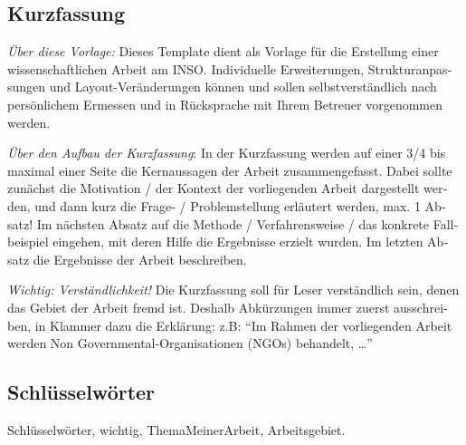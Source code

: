
\cleardoublepage
{}


\begin{otherlanguage}{ngerman}
 
  \chapter*{Kurzfassung}

	\emph{Über diese Vorlage:} 
	Dieses Template dient als Vorlage für die Erstellung einer wissenschaftlichen Arbeit am INSO. Individuelle Erweiterungen, Strukturanpassungen und Layout-Veränderungen können und sollen selbstverständlich nach persönlichem Ermessen und in Rücksprache mit Ihrem Betreuer vorgenommen werden.

	\emph{Über den Aufbau der Kurzfassung}: 
	In der Kurzfassung werden auf einer 3/4 bis maximal einer Seite die Kernaussagen der Arbeit zusammengefasst. Dabei sollte zunächst die Motivation / der Kontext der vorliegenden Arbeit dargestellt werden, und dann kurz die Frage- / Problemstellung erläutert werden, max. 1 Absatz! Im nächsten Absatz auf die Methode / Verfahrensweise / das konkrete Fallbeispiel eingehen, mit deren Hilfe die Ergebnisse erzielt wurden. Im letzten Absatz die Ergebnisse der Arbeit beschreiben. 

	\emph{Wichtig: Verständlichkeit!} 
	Die Kurzfassung soll für Leser verständlich sein, denen das Gebiet der Arbeit fremd ist. Deshalb Abkürzungen immer zuerst ausschreiben, in Klammer dazu die Erklärung: z.B: ``Im Rahmen der vorliegenden Arbeit werden Non Governmental-Organisationen (NGOs) behandelt, \ldots''

  \bigskip
  
  \section*{Schl\"usselw\"orter}
  Schl\"usselw\"orter, wichtig, ThemaMeinerArbeit, Arbeitsgebiet. 

\end{otherlanguage}


